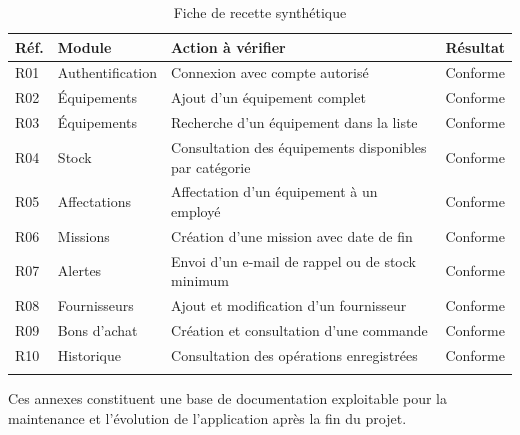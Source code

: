 \begin{longtable}{|m{1.5cm}|m{4.5cm}|m{5cm}|m{2cm}|}
\hline
\textbf{Réf.} & \textbf{Module} & \textbf{Action à vérifier} & \textbf{Résultat} \\
\hline
\endhead
\endfoot
\endlastfoot
\hline
R01 & Authentification & Connexion avec compte autorisé & Conforme \\
\hline
R02 & Équipements & Ajout d'un équipement complet & Conforme \\
\hline
R03 & Équipements & Recherche d'un équipement dans la liste & Conforme \\
\hline
R04 & Stock & Consultation des équipements disponibles par catégorie & Conforme \\
\hline
R05 & Affectations & Affectation d'un équipement à un employé & Conforme \\
\hline
R06 & Missions & Création d'une mission avec date de fin & Conforme \\
\hline
R07 & Alertes & Envoi d'un e-mail de rappel ou de stock minimum & Conforme \\
\hline
R08 & Fournisseurs & Ajout et modification d'un fournisseur & Conforme \\
\hline
R09 & Bons d'achat & Création et consultation d'une commande & Conforme \\
\hline
R10 & Historique & Consultation des opérations enregistrées & Conforme \\
\hline
\captionsetup{justification=centering,margin=1cm}
\caption{Fiche de recette synthétique}
\end{longtable}

Ces annexes constituent une base de documentation exploitable pour la maintenance et l'évolution de l'application après la fin du projet.
